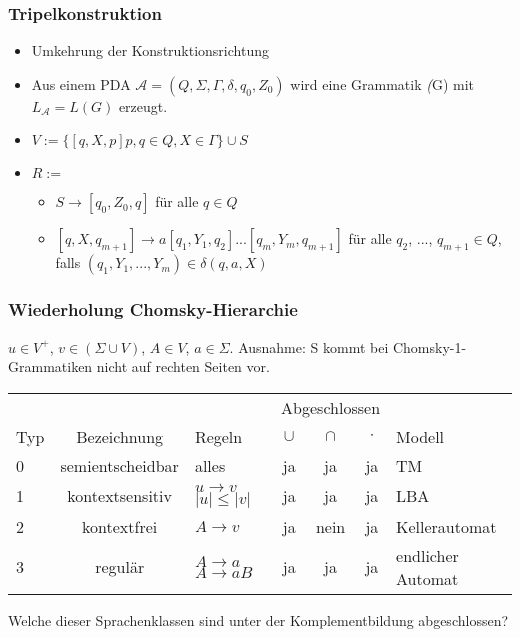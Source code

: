 \begin{frame}
 \frametitle{Tripelkonstruktion}
 \begin{itemize}
  \item Umkehrung der Konstruktionsrichtung
  \item Aus einem PDA $\mathcal{A} = (Q, \Sigma, \Gamma, \delta, q_0, Z_0)$ wird eine Grammatik \textit(G) mit $L_{\mathcal{A}} = L(G)$ erzeugt.
 \end{itemize} 
 \begin{itemize}
  \item $V := \{[q, X, p]p, q \in Q, X \in \Gamma \} \cup S$
  \item $R := $
  \begin{itemize}
   \item $S \rightarrow [q_0, Z_0, q]$ für alle $q \in Q$
   \item $[q, X, q_{m+1}] \rightarrow a[q_1, Y_1, q_2] ... [q_m, Y_m, q_{m+1}]$ für alle $q_2$, ..., $q_{m+1} \in Q$,
   falls $(q_1, Y_1, ..., Y_m) \in \delta(q, a, X)$
  \end{itemize}
 \end{itemize}

\end{frame}


\begin{frame}
 \frametitle{Wiederholung Chomsky-Hierarchie}
 $u \in V^+$, $v \in (\Sigma \cup V)$, $A \in V$, $a \in \Sigma$.
  Ausnahme: S kommt bei Chomsky-1-Grammatiken nicht auf rechten Seiten vor.
 \begin{table}
 \begin{center}
 \begin{tabular}{| l | c | p{1.4cm} | c | c | c | l |}
 \hline
 & & & \multicolumn{3}{|c|}{Abgeschlossen} &\\
 Typ & Bezeichnung & Regeln & $\cup$ & $\cap$ & $\cdot$ & Modell\\ \hline
 0 & semientscheidbar & alles & ja & ja & ja & TM \\ \hline
 1 & kontextsensitiv & $u \rightarrow v$ $|u| \leq |v|$ & ja & ja & ja &  LBA \\ \hline
 2 & kontextfrei & $A \rightarrow v$ & ja & nein & ja & Kellerautomat \\ \hline
 3 & regulär & $A \rightarrow a$  $A \rightarrow aB$ & ja & ja & ja & endlicher Automat \\ \hline
 \end{tabular}
 \end{center}
 \end{table}
\pause
Welche dieser Sprachenklassen sind unter der Komplementbildung abgeschlossen?
\end{frame}

